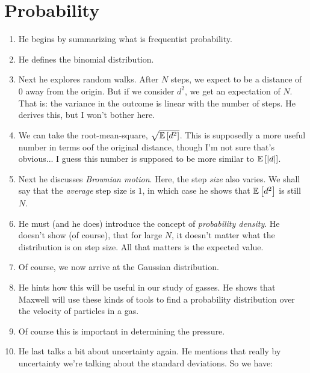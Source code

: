 \section{Probability}

\begin{enumerate}

  \item He begins by summarizing what is frequentist probability.

  \item He defines the binomial distribution.

  \item Next he explores random walks. After $N$ steps, we expect to be
  a distance of $0$ away from the origin. But if we consider $d^2$, we
  get an expectation of $N$. That is: the variance in the outcome is
  linear with the number of steps. He derives this, but I won't bother
  here.

  \item We can take the root-mean-square, $\sqrt{\mathbb{E} \left[ {d^2} \right]}$.
  This is supposedly a more useful number in terms oof the original
  distance, though I'm not sure that's obvious... I guess this number is
  supposed to be more similar to $\mathbb{E} \left[ {\left|d\right|} \right]$.

  \item Next he discusses \emph{Brownian motion}. Here, the step
  \emph{size} also varies. We shall say that the \emph{average} step
  size is $1$, in which case he shows that $\mathbb{E} \left[ {d^2} \right]$ is still
  $N$.

  \item He must (and he does) introduce the concept of \emph{probability
  density}. He doesn't show (of course), that for large $N$, it doesn't
  matter what the distribution is on step size. All that matters is the
  expected value.

  \item Of course, we now arrive at the Gaussian distribution.

  \item He hints how this will be useful in our study of gasses. He
  shows that Maxwell will use these kinds of tools to find a probability
  distribution over the velocity of particles in a gas.

  \item Of course this is important in determining the pressure.

  \item He last talks a bit about uncertainty again. He mentions that
  really by uncertainty we're talking about the standard deviations. So
  we have:


\end{enumerate}
